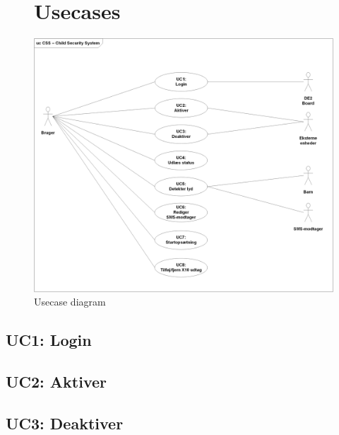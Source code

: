 \begin{figure}[!htbp] \centering
\section{Usecases}
\vspace*{\fill}
\includegraphics[width=\textwidth]{billeder/diagrammer/Usecase_Diagram}
\caption{Usecase diagram}
\label{lab:usecasediagram}
\vspace*{\fill}
\end{figure}

\clearpage


\subsection{UC1: Login}



\subsection{UC2: Aktiver}



\subsection{UC3: Deaktiver}


